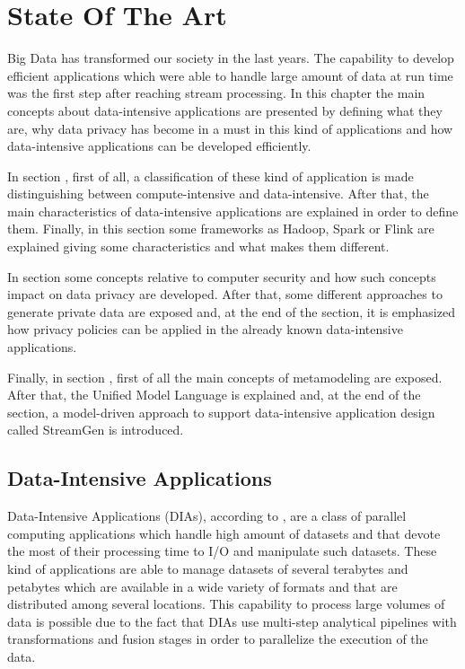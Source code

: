\chapter[State Of The Art]{State Of The Art}
\label{sec:chapter2}

Big Data has transformed our society in the last years. The capability to develop efficient applications which were able to handle large amount of data at run time was the first step after reaching stream processing. In this chapter the main concepts about data-intensive applications are presented by defining what they are, why data privacy has become in a must in this kind of applications and how data-intensive applications can be developed efficiently.

In section , first of all, a classification of these kind of application is made distinguishing between compute-intensive and data-intensive. After that, the main characteristics of data-intensive applications are explained in order to define them. Finally, in this section some frameworks as Hadoop, Spark or Flink are explained giving some characteristics and what makes them different.

In section  some concepts relative to computer security and how such concepts impact on data privacy are developed. After that, some different approaches to generate private data are exposed and, at the end of the section, it is emphasized how privacy policies can be applied in the already known data-intensive applications.

Finally, in section , first of all the main concepts of metamodeling are exposed. After that, the Unified Model Language is explained and, at the end of the section, a model-driven approach to support data-intensive application design called StreamGen is introduced.

\section{Data-Intensive Applications}
\label{Data-Intensive Applications}

Data-Intensive Applications (DIAs), according to \cite{cloudcomputing}, are a class of parallel computing applications which handle high amount of datasets and that devote the most of their processing time to I/O and manipulate such datasets. These kind of applications are able to manage datasets of several terabytes and petabytes which are available in a wide variety of formats and that are distributed among several locations. This capability to process large volumes of data is possible due to the fact that DIAs use multi-step analytical pipelines with transformations and fusion stages in order to parallelize the execution of the data.

